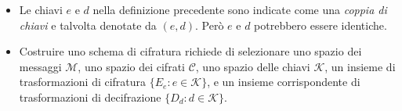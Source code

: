 \documentclass{article}
\theoremstyle{definition}
\begin{document}
\begin{itemize}
    \item Le chiavi \( e \) e \( d \) nella definizione precedente sono indicate come una \textit{coppia di chiavi} e talvolta denotate da \( (e, d) \). Però \( e \) e \( d \) potrebbero essere identiche.
    \item Costruire uno schema di cifratura richiede di selezionare uno spazio dei messaggi \( \mathcal{M} \), uno spazio dei cifrati \( \mathcal{C} \), uno spazio delle chiavi \( \mathcal{K} \), un insieme di trasformazioni di cifratura \( \{E_e : e \in \mathcal{K}\} \), e un insieme corrispondente di trasformazioni di decifrazione \( \{D_d : d \in \mathcal{K}\} \).\cite{domini}
\end{itemize}





\end{document}
